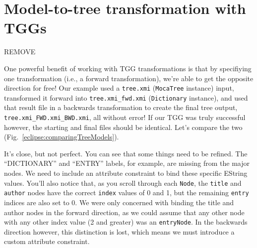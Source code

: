 \newpage
\section{Model-to-tree transformation with TGGs}
\genHeader

{\huge REMOVE}

One powerful benefit of working with TGG transformations is that by specifiying one transformation (i.e., a forward transformation), we're able to get the
opposite direction for free! Our example used a \texttt{tree.xmi} (\texttt{MocaTree}
instance) input, transformed it forward into \texttt{tree.xmi\_fwd.xmi} (\texttt{Dictionary} instance), and used that result file in a backwards
transformation to create the final tree output, \texttt{tree.xmi\_FWD.xmi\_BWD.xmi}, all without error! If our TGG was truly successful however,
the starting and final files should be identical. Let's compare the two (Fig.~\ref{eclipse:comparingTreeModels}).

It's close, but not perfect. You can see that some things need to be refined. The ``DICTIONARY'' and ``ENTRY'' labels, for example, are missing from the
major nodes. We need to include an attribute constraint to bind these specific EString values. You'll also notice that, as you scroll through each
\texttt{Node}, the \texttt{title} and \texttt{author} nodes have the correct \texttt{index} values of 0 and 1, but the remaining \texttt{entry} indices are also
set to 0. We were only concerned with binding the title and author nodes in the forward direction, as we could assume that any other node with any other index
value (2 and greater) was an \texttt{entryNode}. In the backwards direction however, this distinction is lost, which means we must introduce a custom attribute constraint.



